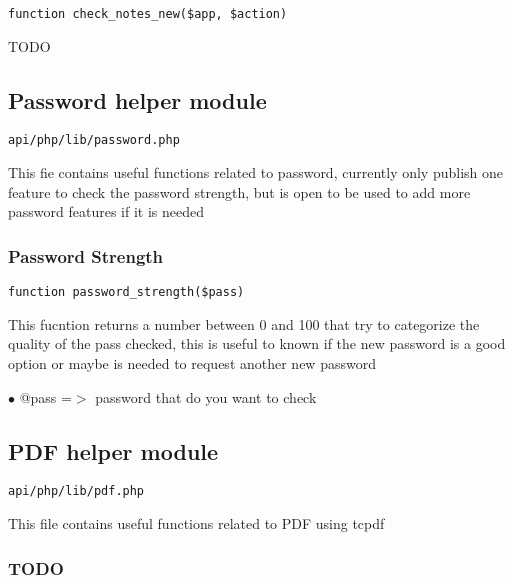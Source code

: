 \documentclass[a4paper]{article}
\begin{document}
\begin{lstlisting}
function check_notes_new($app, $action)
\end{lstlisting}

TODO

\hypertarget{toc499}{}
\subsection{Password helper module}

\begin{lstlisting}
api/php/lib/password.php
\end{lstlisting}

This fie contains useful functions related to password, currently only publish one feature to check
the password strength, but is open to be used to add more password features if it is needed

\hypertarget{toc500}{}
\subsubsection{Password Strength}

\begin{lstlisting}
function password_strength($pass)
\end{lstlisting}

This fucntion returns a number between 0 and 100 that try to categorize
the quality of the pass checked, this is useful to known if the new
password is a good option or maybe is needed to request another new
password

\begin{compactitem}
\item[\color{myblue}$\bullet$] @pass =$>$ password that do you want to check
\end{compactitem}

\hypertarget{toc501}{}
\subsection{PDF helper module}

\begin{lstlisting}
api/php/lib/pdf.php
\end{lstlisting}

This file contains useful functions related to PDF using tcpdf

\hypertarget{toc502}{}
\subsubsection{TODO}
\end{document}
